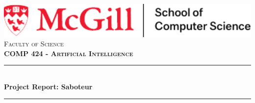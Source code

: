 \begin{titlepage}

\newcommand{\HRule}{\rule{\linewidth}{0.5mm}} %





\begin{center} %


\hspace*{-0.30in}
\includegraphics[width = 18cm]{./figures/mcgill_socs.pdf}\\[1.0cm]
\textsc{\Large Faculty of Science}\\[1.2cm]
\textbf{\textsc{\huge COMP 424 - Artificial Intelligence}}\\[1.0cm]


\HRule \\[0.4cm]
{ \huge \bfseries Project Report: Saboteur}\\
\HRule \\[1.5cm]
\end{center}


\end{titlepage}
